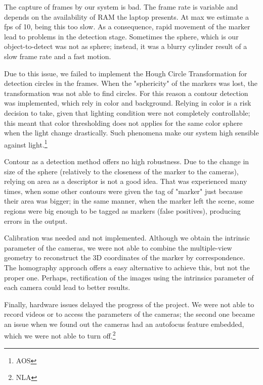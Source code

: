 \documentclass[a4paper,12pt]{article}
\begin{document}
The capture of frames by our system is bad. The frame rate is variable and depends on the availability of RAM the laptop presents. At max we estimate a fps of 10, being this too slow. As a consequence, rapid movement of the marker lead to problems in the detection stage. Sometimes the sphere, which is our object-to-detect was not as sphere; instead, it was a blurry cylinder result of a slow frame rate and a fast motion.


Due to this issue, we failed to implement the Hough Circle Transformation for detection circles in the frames. When the "sphericity" of the markers was lost, the transformation was not able to find circles. For this reason a contour detection was implemented, which rely in color and background. Relying in color is a risk decision to take, given that lighting condition were not completely controllable; this meant that color thresholding does not applies for the same color sphere when the light change drastically. Such phenomena make our system high sensible against light.\footnote{AOS}


Contour as a detection method offers no high robustness. Due to the change in size of the sphere (relatively to the closeness of the marker to the cameras), relying on area as a descriptor is not a good idea. That was experienced many times, when some other contours were given the tag of "marker" just because their area was bigger; in the same manner, when the marker left the scene, some regions were big enough to be tagged as markers (false positives), producing errors in the output.


Calibration was needed and not implemented. Although we obtain the intrinsic parameter of the cameras, we were not able to combine the multiple-view geometry to reconstruct the 3D coordinates of the marker by correspondence. The homography approach offers a easy alternative to achieve this, but not the proper one. Perhaps, rectification of the images using the intrinsics parameter of each camera could lead to better results.


Finally, hardware issues delayed the progress of the project. We were not able to record videos or to access the parameters of the cameras; the second one became an issue when we found out the cameras had an autofocus feature embedded, which we were not able to turn off.\footnote{NLA}
\end{document}
